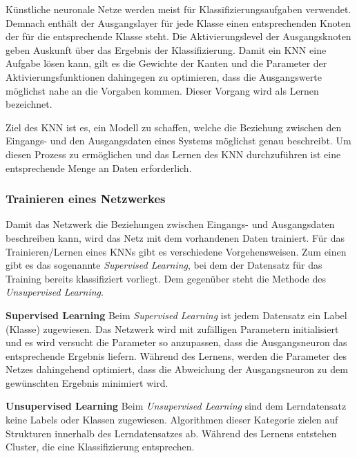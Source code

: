 \documentclass[11pt]{article}
\begin{document}
Künstliche neuronale Netze werden meist für Klassifizierungsaufgaben verwendet. Demnach enthält der Ausgangslayer für jede Klasse einen entsprechenden Knoten der für die entsprechende Klasse steht. Die Aktivierungslevel der Ausgangsknoten geben Auskunft über das Ergebnis der Klassifizierung.  Damit ein KNN eine Aufgabe lösen kann, gilt es die Gewichte der Kanten und die Parameter der Aktivierungsfunktionen dahingegen zu optimieren, dass die Ausgangswerte möglichst nahe an die Vorgaben kommen. Dieser Vorgang wird als Lernen bezeichnet.

Ziel des KNN ist es, ein Modell zu schaffen, welche die Beziehung zwischen den Eingangs- und den Ausgangsdaten eines Systems möglichst genau beschreibt. Um diesen Prozess zu ermöglichen und das Lernen des KNN durchzuführen ist eine entsprechende Menge an Daten erforderlich.\parencite{M.AnderssonM.Arvola}\parencite{Chollet2017}

\subsubsection{Trainieren eines Netzwerkes}

Damit das Netzwerk die Beziehungen zwischen Eingangs- und Ausgangsdaten beschreiben kann, wird das Netz mit dem vorhandenen Daten trainiert. Für das Trainieren/Lernen eines KNNs gibt es verschiedene Vorgehensweisen. Zum einen gibt es das sogenannte \textit{Supervised Learning}, bei dem der Datensatz für das Training bereits klassifiziert vorliegt. Dem gegenüber steht die Methode des \textit{Unsupervised Learning}.

\textbf{Supervised Learning}\newline
Beim \textit{Supervised Learning} ist jedem Datensatz ein Label (Klasse) zugewiesen. Das Netzwerk wird mit zufälligen Parametern initialisiert und es wird versucht die Parameter so anzupassen, dass die Ausgangsneuron das entsprechende Ergebnis liefern. Während des Lernens, werden die Parameter des Netzes dahingehend optimiert, dass die Abweichung der Ausgangsneuron zu dem gewünschten Ergebnis minimiert wird.\parencite{Pattanayak2017}

\textbf{Unsupervised Learning}\newline
Beim \textit{Unsupervised Learning} sind dem Lerndatensatz keine Labels oder Klassen zugewiesen. Algorithmen dieser Kategorie zielen auf Strukturen innerhalb des Lerndatensatzes ab. Während des Lernens entstehen Cluster, die eine Klassifizierung entsprechen.\parencite{Pattanayak2017}
\end{document}
